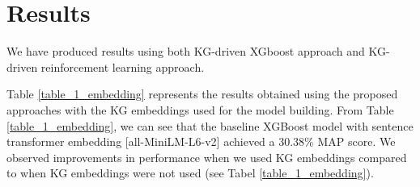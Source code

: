 \documentclass[11pt]{article}
\begin{document}





\section{Results} \label{sec_results}

We have produced results using both KG-driven XGboost approach and KG-driven reinforcement learning approach.

Table \ref{table_1_embedding} represents the results obtained using the proposed approaches with the KG embeddings used for the model building. From Table \ref{table_1_embedding}, we can see that the baseline XGBoost model with sentence transformer embedding [all-MiniLM-L6-v2] achieved a 30.38\% MAP score. We observed improvements in performance when we used KG embeddings compared to when KG embeddings were not used (see Tabel \ref{table_1_embedding}). 
\end{document}
